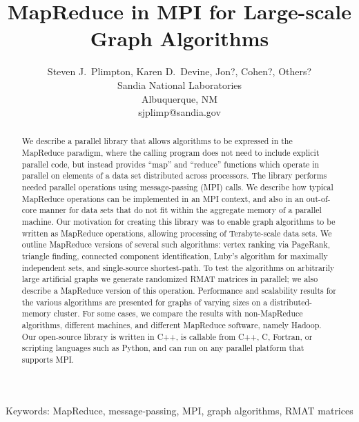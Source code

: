\documentclass[11pt]{article}
\begin{document}
\title{Map{R}educe in {MPI} for Large-scale Graph Algorithms}

\author{
Steven J.~Plimpton, Karen D.~Devine, Jon?, Cohen?, Others? \\
Sandia National Laboratories \\
Albuquerque, NM \\
sjplimp@sandia.gov
}

\date{}

\maketitle

\centerline{Keywords: MapReduce, message-passing, MPI, graph
algorithms, RMAT matrices}

\vspace*{0.4in}

\begin{abstract}

We describe a parallel library that allows algorithms to be expressed
in the MapReduce paradigm, where the calling program does not need to
include explicit parallel code, but instead provides ``map'' and
``reduce'' functions which operate in parallel on elements of a data
set distributed across processors.  The library performs needed
parallel operations using message-passing (MPI) calls.  We describe
how typical MapReduce operations can be implemented in an MPI context,
and also in an out-of-core manner for data sets that do not fit within
the aggregate memory of a parallel machine.  Our motivation for
creating this library was to enable graph algorithms to be written as
MapReduce operations, allowing processing of Terabyte-scale data sets.
We outline MapReduce versions of several such algorithms: vertex
ranking via PageRank, triangle finding, connected component
identification, Luby's algorithm for maximally independent sets, and
single-source shortest-path.  To test the algorithms on arbitrarily
large artificial graphs we generate randomized RMAT matrices in
parallel; we also describe a MapReduce version of this operation.
Performance and scalability results for the various algorithms are
presented for graphs of varying sizes on a distributed-memory cluster.
For some cases, we compare the results with non-MapReduce algorithms,
different machines, and different MapReduce software, namely Hadoop.
Our open-source library is written in C++, is callable from C++, C,
Fortran, or scripting languages such as Python, and can run on any
parallel platform that supports MPI.

\end{abstract}

\pagebreak










\end{document}
